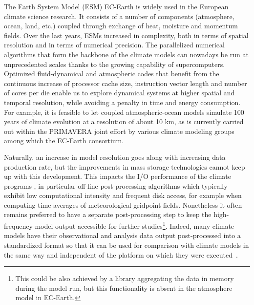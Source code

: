 \documentclass[procedia]{easychair}
\begin{document}

The Earth System Model (ESM) EC-Earth \cite{ECEARTHv22} is widely used in the European climate science research. 
It consists of a number of components (atmosphere, ocean, land, etc.) coupled 
through exchange of heat, moisture and momentum fields. 
Over the last years, ESMs increased in complexity, both in terms of spatial resolution and in terms of numerical precision. 
%
The parallelized numerical algorithms that form the backbone of the climate models
can nowadays be run at unprecedented scales thanks to the
growing capability of supercomputers. 
Optimized fluid-dynamical and atmospheric codes that benefit from the continuous 
increase of processor cache size, instruction vector length and number of cores per die enable us to explore dynamical systems at higher 
spatial and temporal resolution, while avoiding a penalty in time and energy consumption. For example, it is feasible to let coupled atmospheric-ocean 
models simulate 100 years of climate evolution at a resolution of about 10 km, as is currently carried out within the PRIMAVERA joint effort 
\cite{PRIMAVERA} by various climate modeling groups among which the EC-Earth consortium.

Naturally, an increase in model resolution goes along with increasing data production rate, but the improvements in mass storage technologies cannot keep up with this development.
This impacts the I/O performance of the climate programs \cite{Asif20142370}, in particular off-line post-processing algorithms which typically exhibit low computational intensity 
and frequent disk access, for example when computing time averages of meteorological gridpoint fields. 
Nonetheless it often remains preferred to 
have a separate post-processing step to keep the high-frequency model output accessible for further studies\footnote{This could be also achieved by a 
library aggregating the data in memory during the model run, but this functionality is absent in the atmosphere model in EC-Earth.}. 
Indeed, many climate models have their observational and analysis data output post-processed into a standardized format so that it can be used for comparison with climate models in
the same way and independent of the platform on which they were executed~\cite{CMIP6}.
 
\end{document}
